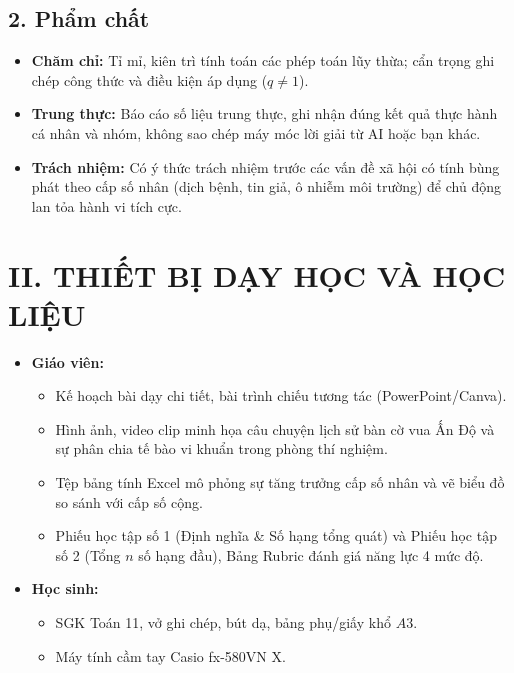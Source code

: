 \documentclass[12pt, a4paper]{article}
\begin{document}
\subsection*{2. Phẩm chất}

\begin{itemize}[leftmargin=1.2cm]
    \item \textbf{Chăm chỉ:} Tỉ mỉ, kiên trì tính toán các phép toán lũy thừa; cẩn trọng ghi chép công thức và điều kiện áp dụng ($q \neq 1$).
    \item \textbf{Trung thực:} Báo cáo số liệu trung thực, ghi nhận đúng kết quả thực hành cá nhân và nhóm, không sao chép máy móc lời giải từ AI hoặc bạn khác.
    \item \textbf{Trách nhiệm:} Có ý thức trách nhiệm trước các vấn đề xã hội có tính bùng phát theo cấp số nhân (dịch bệnh, tin giả, ô nhiễm môi trường) để chủ động lan tỏa hành vi tích cực.
\end{itemize}

\section*{II. THIẾT BỊ DẠY HỌC VÀ HỌC LIỆU}

\begin{itemize}[leftmargin=1.2cm]
    \item \textbf{Giáo viên:}
    \begin{itemize}[leftmargin=0.6cm]
        \item Kế hoạch bài dạy chi tiết, bài trình chiếu tương tác (PowerPoint/Canva).
        \item Hình ảnh, video clip minh họa câu chuyện lịch sử bàn cờ vua Ấn Độ và sự phân chia tế bào vi khuẩn trong phòng thí nghiệm.
        \item Tệp bảng tính Excel mô phỏng sự tăng trưởng cấp số nhân và vẽ biểu đồ so sánh với cấp số cộng.
        \item Phiếu học tập số 1 (Định nghĩa \& Số hạng tổng quát) và Phiếu học tập số 2 (Tổng $n$ số hạng đầu), Bảng Rubric đánh giá năng lực 4 mức độ.
    \end{itemize}
    \item \textbf{Học sinh:}
    \begin{itemize}[leftmargin=0.6cm]
        \item SGK Toán 11, vở ghi chép, bút dạ, bảng phụ/giấy khổ $A3$.
        \item Máy tính cầm tay Casio fx-580VN X.
    \end{itemize}
\end{itemize}
\end{document}
